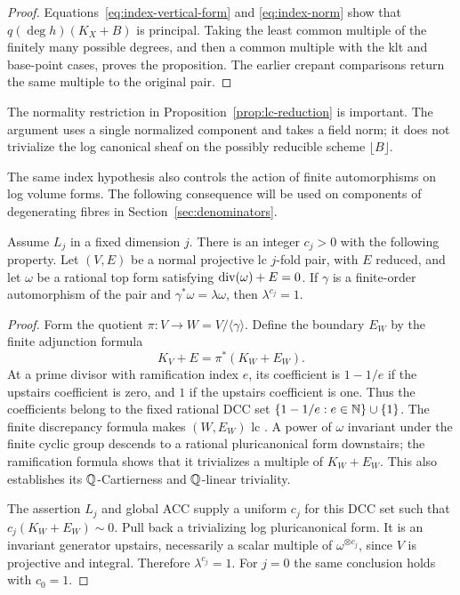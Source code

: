 \begin{proof}
Equations~\eqref{eq:index-vertical-form} and \eqref{eq:index-norm}
show that $q(\deg h)(K_X+B)$ is principal. Taking the least common
multiple of the finitely many possible degrees, and then a common
multiple with the klt and base-point cases, proves the proposition.
The earlier crepant comparisons return the same multiple to the
original pair.
\end{proof}

The normality restriction in Proposition~\ref{prop:lc-reduction} is
important. The argument uses a single normalized component and takes
a field norm; it does not trivialize the log canonical sheaf on the
possibly reducible scheme $\lfloor B\rfloor$.

The same index hypothesis also controls the action of finite
automorphisms on log volume forms. The following consequence will be
used on components of degenerating fibres in
Section~\ref{sec:denominators}.

\begin{lemma}\label{lem:finite-character}
Assume $L_j$ in a fixed dimension $j$. There is an integer $c_j>0$
with the following property. Let $(V,E)$ be a normal projective lc
$j$-fold pair, with $E$ reduced, and let $\omega$ be a rational top
form satisfying $\operatorname{div}(\omega)+E=0$. If $\gamma$ is a finite-order
automorphism of the pair and
$\gamma^*\omega=\lambda\omega$, then $\lambda^{c_j}=1$.
\end{lemma}

\begin{proof}
Form the quotient $\pi:V\to W=V/\langle\gamma\rangle$. Define
the boundary $E_W$ by the finite adjunction formula
\[
                       K_V+E=\pi^*(K_W+E_W).
\]
At a prime divisor with ramification index $e$, its coefficient is
$1-1/e$ if the upstairs coefficient is zero, and $1$ if the
upstairs coefficient is one. Thus the coefficients belong to the
fixed rational DCC set
$\{1-1/e:e\in\mathbb N\}\cup\{1\}$. The finite discrepancy formula
makes $(W,E_W)$ lc \cite[Proposition~5.20]{KollarMori1998}. A power of
$\omega$ invariant under the finite cyclic group descends to a
rational pluricanonical form downstairs; the ramification formula
shows that it trivializes a multiple of $K_W+E_W$. This also
establishes its $\mathbb Q$-Cartierness and $\mathbb Q$-linear triviality.

The assertion $L_j$ and global ACC supply a uniform $c_j$ for this
DCC set such that $c_j(K_W+E_W)\sim0$. Pull back a trivializing
log pluricanonical form. It is an invariant generator upstairs,
necessarily a scalar multiple of $\omega^{\otimes c_j}$, since
$V$ is projective and integral. Therefore $\lambda^{c_j}=1$.
For $j=0$ the same conclusion holds with $c_0=1$.
\end{proof}

